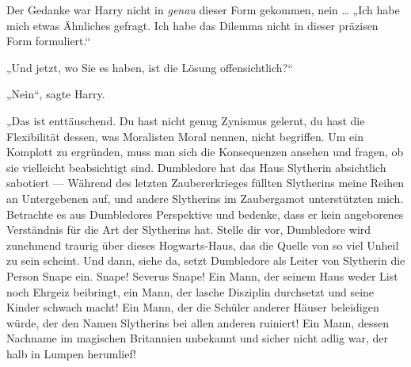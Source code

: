 Der Gedanke war Harry nicht in \emph{genau} dieser Form gekommen, nein …
„Ich habe mich etwas Ähnliches gefragt. Ich habe das Dilemma nicht in dieser präzisen Form formuliert.“

„Und jetzt, wo Sie es haben, ist die Lösung offensichtlich?“

„Nein“, sagte Harry.

„Das ist enttäuschend. Du hast nicht genug Zynismus gelernt, du hast die Flexibilität dessen, was Moralisten Moral nennen, nicht begriffen. Um ein Komplott zu ergründen, muss man sich die Konsequenzen ansehen und fragen, ob sie vielleicht beabsichtigt sind. Dumbledore hat das Haus Slytherin absichtlich sabotiert —  Während des letzten Zaubererkrieges füllten Slytherins meine Reihen an Untergebenen auf, und andere Slytherins im Zaubergamot unterstützten mich. Betrachte es aus Dumbledores Perspektive und bedenke, dass er kein angeborenes Verständnis für die Art der Slytherins hat. Stelle dir vor, Dumbledore wird zunehmend traurig über dieses Hogwarts-Haus, das die Quelle von so viel Unheil zu sein scheint.
Und dann, siehe da, setzt Dumbledore als Leiter von Slytherin die Person Snape ein. Snape! Severus Snape! Ein Mann, der seinem Haus weder List noch Ehrgeiz beibringt, ein Mann, der lasche Disziplin durchsetzt und seine Kinder schwach macht! Ein Mann, der die Schüler anderer Häuser beleidigen würde, der den Namen Slytherins bei allen anderen ruiniert! Ein Mann, dessen Nachname im magischen Britannien unbekannt und sicher nicht adlig war, der halb in Lumpen herumlief!
